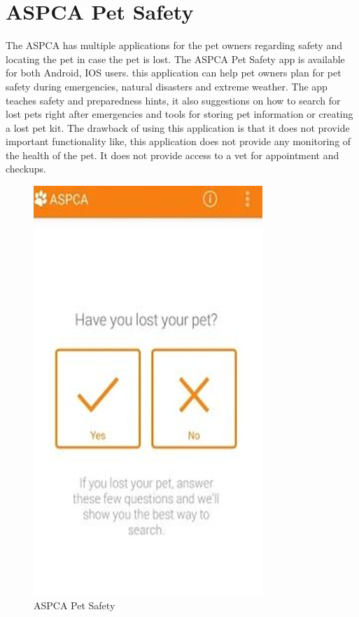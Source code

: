 \section{ASPCA Pet Safety\cite{capsnine}}
The ASPCA has multiple applications for the pet owners regarding safety and locating the pet in case the pet is lost. The ASPCA Pet Safety app is available for both Android, IOS users. this application can help pet owners plan for pet safety during emergencies, natural disasters and extreme weather. The app teaches safety and preparedness hints, it also suggestions on how to search for lost pets right after emergencies and tools for storing pet information or creating a lost pet kit. The drawback of using this application is that it does not provide important functionality like, this application does not provide any monitoring of the health of the pet. It does not provide access to a vet for appointment and checkups.
\begin{figure}[H]
  \centering
    \includegraphics[scale=0.3]{24ASPCAapp}
      \caption{ASPCA Pet Safety}
\end{figure}
